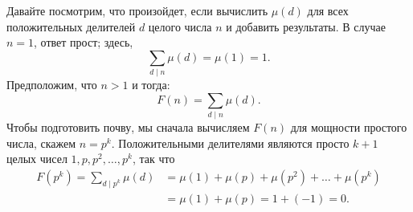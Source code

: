 \documentclass[11pt]{article}
\begin{document}
	Давайте посмотрим, что произойдет, если вычислить $\mu(d)$ для всех положительных делителей $d$ целого числа $n$ и добавить результаты. В случае $n = 1$, ответ прост; здесь, \[\sum \limits_{d\mid n}\mu(d)=\mu(1)=1.\]
	Предположим, что $n > 1$ и тогда: \[F(n)=\sum \limits_{d\mid n}\mu(d).\] 
	Чтобы подготовить почву, мы сначала вычисляем $F(n)$ для мощности простого числа, скажем $n=p^{k}$. Положительными делителями являются просто $k + 1$ целых чисел $1,p,p^{2},\ldots,p^{k}$, так что
	\begin{align*}
		F(p^{k})=\sum \limits_{d\mid p^{k}}\mu(d)&=\mu(1)+\mu(p)+\mu(p^{2})+\ldots+\mu(p^{k})\\
		&= \mu(1)+\mu(p)=1+(-1)=0.
	\end{align*}	
\end{document}
